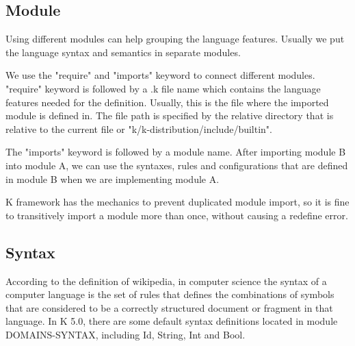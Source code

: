 \documentclass[a4paper]{article}
\begin{document}
\subsection{Module}
Using different modules can help grouping the language features. Usually we put the language syntax and semantics in separate modules.

We use the "require" and "imports" keyword to connect different modules. "require" keyword is followed by a .k file name which contains the language features needed for the definition. Usually, this is the file where the imported module is defined in. The file path is specified by the relative directory that is relative to the current file or "k/k-distribution/include/builtin". 

The "imports" keyword is followed by a module name. After importing module B into module A, we can use the syntaxes, rules and configurations that are defined in module B when we are implementing module A.

K framework has the mechanics to prevent duplicated module import, so it is fine to transitively import a module more than once, without causing a redefine error.

\subsection{Syntax}
According to the definition of wikipedia, in computer science the syntax of a computer language is the set of rules that defines the combinations of symbols that are considered to be a correctly structured document or fragment in that language. In K 5.0, there are some default syntax definitions located in module DOMAINS-SYNTAX, including Id, String, Int and Bool.
\end{document}
